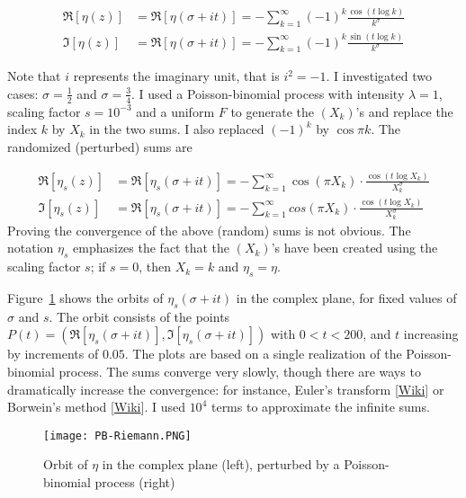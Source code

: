 \documentclass[10pt]{article}
\begin{document}
\begin{align}
 \Re[{\eta(z)}] & = \Re[{\eta(\sigma+it)}]  = - \sum_{k=1}^\infty (-1)^k \frac{\cos(t\log k)}{k^\sigma} \label{eta1} \\
 \Im[{\eta(z)}] & = \Re[{\eta(\sigma+it)}]  = - \sum_{k=1}^\infty (-1)^k \frac{\sin(t\log k)}{k^\sigma} \label{eta2}
\end{align}

Note that $i$ represents the imaginary unit, that is $i^2=-1$. I investigated two cases: $\sigma=\frac{1}{2}$ and $\sigma=\frac{3}{4}$. I used a Poisson-binomial process with intensity $\lambda=1$, scaling factor $s=10^{-3}$ and a uniform $F$ to generate the $(X_k)$'s and replace the index $k$ by $X_k$ in the two sums. I also replaced $(-1)^k$ by $\cos\pi k$. The randomized (perturbed) sums are 

\begin{align}
\Re[{\eta_s(z)}]  & = \Re[{\eta_s(\sigma+it)}]  = - \sum_{k=1}^\infty \cos(\pi X_k)\cdot \frac{\cos(t\log X_k)}{X_k^\sigma}\label{eta1b} \\
 \Im[{\eta_s(z)}] & = \Re[{\eta_s(\sigma+it)}]  =- \sum_{k=1}^\infty cos(\pi X_k)\cdot \frac{\cos(t\log X_k)}{X_k^\sigma} \label{eta2b}
\end{align}
Proving the convergence of the above (random) sums is not obvious. The notation $\eta_s$ emphasizes the fact that the $(X_k)$'s have been created using the scaling factor $s$; 
if $s=0$, then $X_k=k$ and $\eta_s=\eta$. 

Figure~\ref{fig:riemann} shows the orbits of $\eta_s(\sigma+it)$ in the complex plane, for fixed values of $\sigma$ and $s$. The orbit consists of the points
$P(t)=(\Re[{\eta_s(\sigma+it)}],\Im[{\eta_s(\sigma+it)}])$  with $0<t<200$, and $t$ increasing by increments of $0.05$. The plots are based on a single realization of the Poisson-binomial process. The sums converge very slowly, though there are ways to dramatically increase the convergence: for instance, Euler's transform [\href{https://en.wikipedia.org/wiki/Series_acceleration}{Wiki}] or 
Borwein's method [\href{https://bit.ly/3EthJXY}{Wiki}]. 
I used $10^4$ terms to approximate the infinite sums. 

\begin{figure}[H]
\centering
\texttt{[image: PB-Riemann.PNG]}
\caption{Orbit of $\eta$ in the complex plane (left), perturbed by a Poisson-binomial process (right)}
\label{fig:riemann}
\end{figure}
\end{document}
